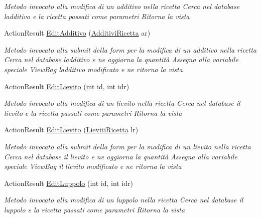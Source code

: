 \begin{DoxyCompactItemize}
\begin{DoxyCompactList}\small\item\em Metodo invocato alla modifica di un additivo nella ricetta Cerca nel database l\textquotesingle{}additivo e la ricetta passati come parametri Ritorna la vista \end{DoxyCompactList}\item 
Action\+Result \mbox{\hyperlink{class_brew_day2_1_1_controllers_1_1_ricette_controller_ad344279d2d02790623793caa5184a8a5}{Edit\+Additivo}} (\mbox{\hyperlink{class_brew_day2_1_1_models_1_1_additivi_ricetta}{Additivi\+Ricetta}} ar)
\begin{DoxyCompactList}\small\item\em Metodo invocato alla submit della form per la modifica di un additivo nella ricetta Cerca nel database l\textquotesingle{}additivo e ne aggiorna la quantità Assegna alla variabile speciale View\+Bag l\textquotesingle{}additivo modificato e ne ritorna la vista \end{DoxyCompactList}\item 
Action\+Result \mbox{\hyperlink{class_brew_day2_1_1_controllers_1_1_ricette_controller_a64a41161a32ff16561aad6ad4cdb4d56}{Edit\+Lievito}} (int id, int idr)
\begin{DoxyCompactList}\small\item\em Metodo invocato alla modifica di un lievito nella ricetta Cerca nel database il lievito e la ricetta passati come parametri Ritorna la vista \end{DoxyCompactList}\item 
Action\+Result \mbox{\hyperlink{class_brew_day2_1_1_controllers_1_1_ricette_controller_a99187569fb5839412db4cc7408d0097c}{Edit\+Lievito}} (\mbox{\hyperlink{class_brew_day2_1_1_models_1_1_lieviti_ricetta}{Lieviti\+Ricetta}} lr)
\begin{DoxyCompactList}\small\item\em Metodo invocato alla submit della form per la modifica di un lievito nella ricetta Cerca nel database il lievito e ne aggiorna la quantità Assegna alla variabile speciale View\+Bag il lievito modificato e ne ritorna la vista \end{DoxyCompactList}\item 
Action\+Result \mbox{\hyperlink{class_brew_day2_1_1_controllers_1_1_ricette_controller_a6f5c5b78d15674336d0825b9cc9c65ec}{Edit\+Luppolo}} (int id, int idr)
\begin{DoxyCompactList}\small\item\em Metodo invocato alla modifica di un luppolo nella ricetta Cerca nel database il luppolo e la ricetta passati come parametri Ritorna la vista \end{DoxyCompactList}\item 

\end{DoxyCompactItemize}
